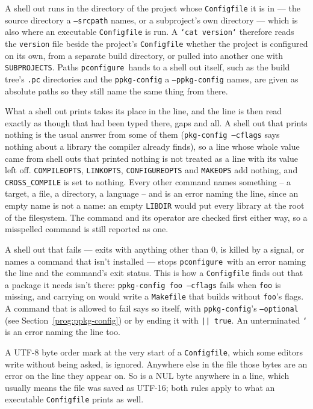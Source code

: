 \documentclass{article}
\newcommand{\pconfigure}{\texttt{pconfigure}}
\begin{document}
A shell out runs in the directory of the project whose
\texttt{Configfile} it is in --- the source directory a
\texttt{--srcpath} names, or a subproject's own directory --- which is
also where an executable \texttt{Configfile} is run.  A
\texttt{`cat version`} therefore reads the \texttt{version} file
beside the project's \texttt{Configfile} whether the project is
configured on its own, from a separate build directory, or pulled into
another one with \texttt{SUBPROJECTS}.  Paths \pconfigure\ hands to a
shell out itself, such as the build tree's \texttt{.pc} directories
and the \texttt{ppkg-config} a \texttt{--ppkg-config} names, are given
as absolute paths so they still name the same thing from there.

What a shell out prints takes its place in the line, and the line is
then read exactly as though that had been typed there, gaps and all.
A shell out that prints nothing is the usual answer from some of them
(\texttt{pkg-config --cflags} says nothing about a library the compiler
already finds), so a line whose whole value came from shell outs that
printed nothing is not treated as a line with its value left off.
\texttt{COMPILEOPTS}, \texttt{LINKOPTS}, \texttt{CONFIGUREOPTS} and
\texttt{MAKEOPS} add nothing, and \texttt{CROSS\_COMPILE} is set to
nothing.  Every other command names something -- a target, a file, a
directory, a language -- and is an error naming the line, since an empty
name is not a name: an empty \texttt{LIBDIR} would put every library at
the root of the filesystem.  The command and its operator are checked
first either way, so a misspelled command is still reported as one.

A shell out that fails --- exits with anything other than 0, is killed
by a signal, or names a command that isn't installed --- stops
\pconfigure\ with an error naming the line and the command's exit
status.  This is how a \texttt{Configfile} finds out that a package it
needs isn't there: \texttt{ppkg-config foo --cflags} fails when
\texttt{foo} is missing, and carrying on would write a
\texttt{Makefile} that builds without \texttt{foo}'s flags.  A command
that is allowed to fail says so itself, with \texttt{ppkg-config}'s
\texttt{--optional} (see Section~\ref{prog:ppkg-config}) or by ending
it with \texttt{|| true}.  An unterminated \texttt{`} is an error
naming the line too.

A UTF-8 byte order mark at the very start of a \texttt{Configfile},
which some editors write without being asked, is ignored.  Anywhere
else in the file those bytes are an error on the line they appear on.
So is a NUL byte anywhere in a line, which usually means the file was
saved as UTF-16; both rules apply to what an executable
\texttt{Configfile} prints as well.
\end{document}
